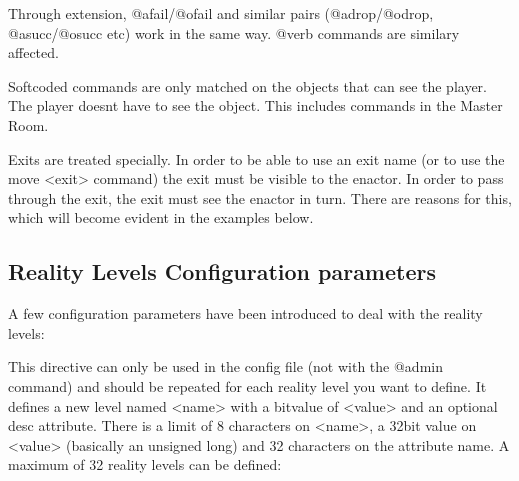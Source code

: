 \documentclass[letterpaper,10pt,english]{sphinxmanual}
\begin{document}
\sphinxAtStartPar
Through extension, @afail/@ofail and similar pairs (@adrop/@odrop,
@asucc/@osucc etc) work in the same way. @verb commands are similary
affected.

\sphinxAtStartPar
Softcoded commands are only matched on the objects that can see the player.
The player doesn\textquotesingle{}t have to see the object. This includes commands in the
Master Room.

\sphinxAtStartPar
Exits are treated specially. In order to be able to use an exit name (or to
use the \textquotesingle{}move \textless{}exit\textgreater{}\textquotesingle{} command) the exit must be visible to the enactor. In
order to pass through the exit, the exit must see the enactor in turn. There
are reasons for this, which will become evident in the examples below.


\subsection{Reality Levels Configuration parameters}
\label{\detokenize{advanced:reality-levels-configuration-parameters}}
\sphinxAtStartPar
A few configuration parameters have been introduced to deal with the reality
levels:

\begin{sphinxVerbatim}[commandchars=\\\{\}]
   \PYG{p}{[}  \PYG{p}{]}
\end{sphinxVerbatim}

\sphinxAtStartPar
This directive can only be used in the config file (not with the @admin
command) and should be repeated for each reality level you want to define.
It defines a new level named \textless{}name\textgreater{} with a bitvalue of \textless{}value\textgreater{} and an
optional desc attribute. There is a limit of 8 characters on \textless{}name\textgreater{}, a
32\sphinxhyphen{}bit value on \textless{}value\textgreater{} (basically an unsigned long) and 32 characters on
the attribute name. A maximum of 32 reality levels can be defined:

\begin{sphinxVerbatim}[commandchars=\\\{\}]
 
 
 
 
 
 
 
 
\end{sphinxVerbatim}
\end{document}
